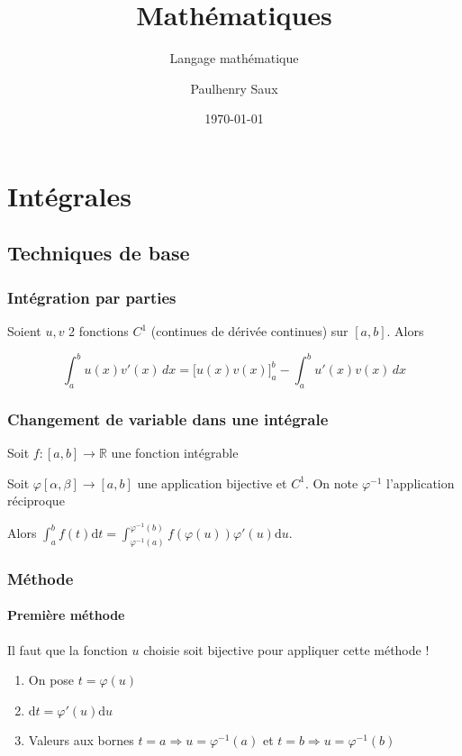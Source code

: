 \documentclass[french]{yLectureNote}
\title{Mathématiques}
\subtitle{Langage mathématique}
\author{Paulhenry Saux}
\date{\today}
\begin{document}
\setcounter{chapter}{3}

	\chapter{Intégrales}
\section{Techniques de base}
\subsection{Intégration par parties}
Soient $u,v$ 2 fonctions $C^1$ (continues de dérivée continues) sur $[a,b]$. Alors
\begin{theorem}[Formule]
\[\int_a^b u(x) v'(x) \, dx  = \Big[u(x) v(x)\Big]_a^b - \int_a^b u'(x) v(x) \, dx\]
\end{theorem}
\subsection{Changement de variable dans une intégrale}
\begin{theorem}[]
Soit $f : [a,b]\to \mathbb{R}$ une fonction intégrable

Soit $\varphi [\alpha,\beta] \to [a,b]$ une application bijective et $C^1$. On note $\varphi^{-1}$ l'application réciproque

Alors $\int^b_a f(t)\mathrm{d}t = \int^{\varphi^{-1}(b)}_{\varphi^{-1}(a)} f(\varphi(u))\varphi'(u)\mathrm{d}u$.
\end{theorem}
\subsection{Méthode}
\subsubsection{Première méthode}
Il faut que la fonction $u$ choisie soit bijective pour appliquer cette méthode !
\begin{enumerate}
 \item On pose $t = \varphi(u)$
 \item $\mathrm{d}t = \varphi'(u)\mathrm{d}u$
 \item Valeurs aux bornes $t=a \Rightarrow u = \varphi^{-1}(a)$ et $t=b \Rightarrow u = \varphi^{-1}(b)$
\end{enumerate}
\end{document}
